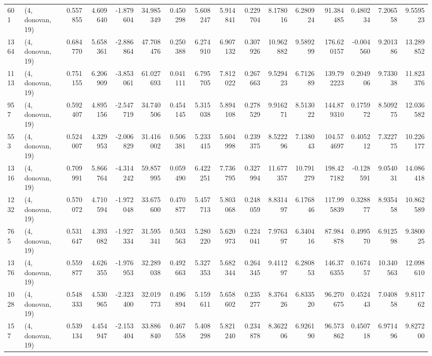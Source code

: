 \begin{tabular}{llrrrrrrrrrrrrrr}
601  &  (4, donovan, 19) &   0.557855 &   4.609640 &  -1.879604 &     34.985349 &    0.450298 &    5.608247 &    5.914841 &  0.229704 &   8.178016 &   6.280924 &    91.384485 &   0.480234 &   7.206558 &   9.559523 \\
1364 &  (4, donovan, 19) &   0.684770 &   5.658361 &  -2.886864 &     47.708476 &    0.250388 &    6.274910 &    6.907132 &  0.307926 &  10.962882 &   9.589299 &   176.620157 &  -0.004560 &   9.201386 &  13.289852 \\
1113 &  (4, donovan, 19) &   0.751155 &   6.206909 &  -3.853061 &     61.027693 &    0.041111 &    6.795705 &    7.812022 &  0.267663 &   9.529423 &   6.712689 &   139.792223 &   0.204906 &   9.733038 &  11.823376 \\
957  &  (4, donovan, 19) &   0.592407 &   4.895156 &  -2.547719 &     34.740506 &    0.454145 &    5.315038 &    5.894108 &  0.278529 &   9.916271 &   8.513022 &   144.879310 &   0.175972 &   8.509275 &  12.036582 \\
553  &  (4, donovan, 19) &   0.524007 &   4.329953 &  -2.006829 &     31.416002 &    0.506381 &    5.233415 &    5.604998 &  0.239375 &   8.522296 &   7.138043 &   104.574697 &   0.405212 &   7.322775 &  10.226177 \\
1316 &  (4, donovan, 19) &   0.709991 &   5.866764 &  -4.314242 &     59.857995 &    0.059490 &    6.422251 &    7.736795 &  0.327994 &  11.677357 &  10.791279 &   198.427182 &  -0.128591 &   9.054031 &  14.086418 \\
1232 &  (4, donovan, 19) &   0.570072 &   4.710594 &  -1.972048 &     33.675600 &    0.470877 &    5.457713 &    5.803068 &  0.248059 &   8.831497 &   6.176846 &   117.995839 &   0.328877 &   8.935458 &  10.862589 \\
765  &  (4, donovan, 19) &   0.531647 &   4.393082 &  -1.927334 &     31.595341 &    0.503563 &    5.280220 &    5.620973 &  0.224041 &   7.976397 &   6.340416 &    87.984878 &   0.499570 &   6.912598 &   9.380025 \\
1376 &  (4, donovan, 19) &   0.559877 &   4.626355 &  -1.976953 &     32.289038 &    0.492663 &    5.327353 &    5.682344 &  0.264345 &   9.411297 &   6.280853 &   146.376355 &   0.167457 &  10.340563 &  12.098610 \\
1028 &  (4, donovan, 19) &   0.548333 &   4.530965 &  -2.323400 &     32.019773 &    0.496894 &    5.159611 &    5.658602 &  0.235277 &   8.376426 &   6.833520 &    96.270675 &   0.452443 &   7.040858 &   9.811762 \\
157  &  (4, donovan, 19) &   0.539134 &   4.454947 &  -2.153404 &     33.886840 &    0.467558 &    5.408298 &    5.821240 &  0.234878 &   8.362206 &   6.926190 &    96.573862 &   0.450718 &   6.971496 &   9.827200 \\

\end{tabular}
